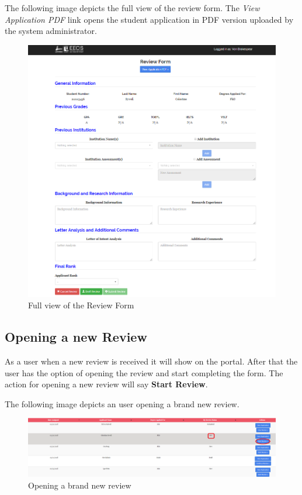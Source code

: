 \documentclass[fontsize=12pt,paper=letter,twoside]{scrartcl}
\begin{document}
\newpage
\bigskip
\noindent The following image depicts the full view of the review form. The \emph{View Application PDF} link opens the student application in PDF version uploaded by the system administrator. 

\begin{figure}[!htb]
\begin{center}
\includegraphics[width=.9\textwidth]{images/review_form.png}
\end{center}
\caption{Full view of the Review Form}
\label{fig:review_form}
\end{figure}

\clearpage
\newpage
\subsection{Opening a new Review}
As a user when a new review is received it will show on the portal. After that the user has the option of opening the review and start completing the form. The action for opening a new review will say \textbf{Start Review}.

\bigskip
\noindent The following image depicts an user opening a brand new review.

\begin{figure}[!htb]
\begin{center}
\includegraphics[width=.9\textwidth]{images/opening_new_review.png}
\end{center}
\caption{Opening a brand new review}
\label{fig:opening_new_review}
\end{figure}
\end{document}
